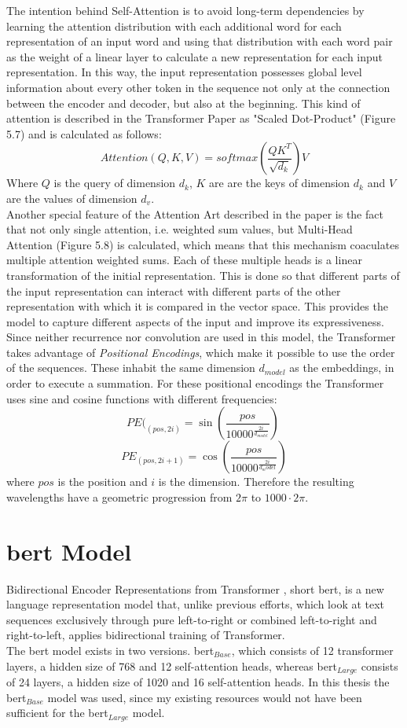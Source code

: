 \documentclass[a4paper, 11pt,titlepage,oneside,openany]{book}
\begin{document}
\noindent The intention behind Self-Attention is to avoid long-term dependencies by learning the attention distribution with each additional word for each representation of an input word and using that distribution with each word pair as the weight of a linear layer to calculate a new representation for each input representation. In this way, the input representation possesses global level information about every other token in the sequence not only at the connection between the encoder and decoder, but also at the beginning. This kind of attention is described in the Transformer Paper as "Scaled Dot-Product" (Figure 5.7) and is calculated as follows:
\[
Attention(Q,K,V)=softmax(\frac{QK^T}{\sqrt{d_k}})V
\]
Where $Q$ is the query of  dimension $d_k$, $K$ are are the keys of dimension $d_k$ and $V$ are the values of dimension $d_v$. \\
\noindent Another special feature of the Attention Art described in the paper is the fact that not only single attention, i.e. weighted sum values, but Multi-Head Attention (Figure 5.8) is calculated, which means that this mechanism coaculates multiple attention weighted sums. Each of these multiple heads is a linear transformation of the initial representation. This is done so that different parts of the input representation can interact with different parts of the other representation with which it is compared in the vector space. This provides the model to capture different aspects of the input and improve its expressiveness.\\

\noindent Since neither recurrence nor convolution are used in this model, the Transformer takes advantage of \textit{Positional Encodings}, which make it possible to use the order of the sequences. These inhabit the same  dimension $d_{model}$ as the embeddings, in order to execute a summation. For these positional encodings the Transformer uses sine and cosine functions with different frequencies:
\[
PE(_{(pos,2i)}=\sin (\frac{pos}{10000^{\frac{2i}{d_{model}}}})
\
\]
\[
PE_{(pos,2i+1)}=\cos (\frac{pos}{10000^{\frac{2i}{d_model}}})
\]
where $pos$ is the position and $i$ is the dimension. Therefore the resulting wavelengths have a geometric progression from $2\pi$ to $1000 \cdot 2\pi$.

\section{\gls{bert} Model}
Bidirectional Encoder Representations from Transformer \cite{bert}, short \gls{bert}, is a new language representation model that, unlike previous efforts, which look at text sequences exclusively through pure left-to-right or combined left-to-right and right-to-left, applies bidirectional training of Transformer. \\
\noindent The \gls{bert} model exists in two versions. \gls{bert}$_{Base}$, which consists of 12 transformer layers, a hidden size of 768 and 12 self-attention heads, whereas \gls{bert}$_{Large}$ consists of 24 layers, a hidden size of 1020 and 16 self-attention heads. In this thesis the \gls{bert}$_{Base}$ model was used, since my existing resources would not have been sufficient for the \gls{bert}$_{Large}$ model.
\end{document}
